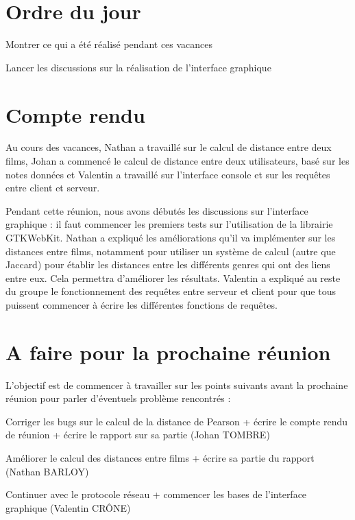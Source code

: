 \documentclass[11pt]{meetingmins}
\begin{document}
\maketitle

\section{Ordre du jour}
\begin{hiddenitems}
	\item Montrer ce qui a été réalisé pendant ces vacances
	\item Lancer les discussions sur la réalisation de l'interface graphique
\end{hiddenitems}

\section{Compte rendu}
Au cours des vacances, Nathan a travaillé sur le calcul de distance entre deux films, Johan a commencé le calcul de distance entre deux utilisateurs, basé sur les notes données et Valentin a travaillé sur l'interface console et sur les requêtes entre client et serveur.\par
Pendant cette réunion, nous avons débutés les discussions sur l'interface graphique : il faut commencer les premiers tests sur l'utilisation de la librairie GTKWebKit. Nathan a expliqué les améliorations qu'il va implémenter sur les distances entre films, notamment pour utiliser un système de calcul (autre que Jaccard) pour établir les distances entre les différents genres qui ont des liens entre eux. Cela permettra d'améliorer les résultats.
Valentin a expliqué au reste du groupe le fonctionnement des requêtes entre serveur et client pour que tous puissent commencer à écrire les différentes fonctions de requêtes.

\section{A faire pour la prochaine réunion}
L'objectif est de commencer à travailler sur les points suivants avant la prochaine réunion pour parler d'éventuels problème rencontrés :
\begin{items}
	\item Corriger les bugs sur le calcul de la distance de Pearson + écrire le compte rendu de réunion + écrire le rapport sur sa partie (Johan TOMBRE)
	\item Améliorer le calcul des distances entre films + écrire sa partie du rapport (Nathan BARLOY)
	\item Continuer avec le protocole réseau + commencer les bases de l'interface graphique (Valentin CRÔNE)
\end{items}
\vspace{1cm}
\end{document}
